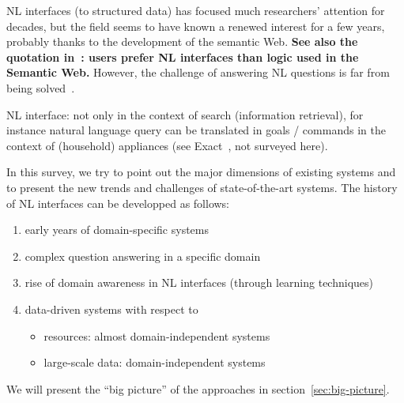 \documentclass[10pt,journal,letterpaper,compsoc]{IEEEtran}
\begin{document}
NL interfaces (to structured data) has focused much researchers' attention for
decades, but the field seems to have known a renewed interest for a few
years, probably thanks to the development of the semantic Web. {\bf See also
the quotation in~\cite{DBLP:journals/semweb/LopezUSM11}: users prefer NL interfaces
than logic used in the Semantic Web.}
However, the challenge of answering NL
questions is far from being solved~\cite{Kotov:2010:TNQ:1772690.1772746}.

NL interface: not only in the context of search (information retrieval), for
instance natural language query can be translated in goals / commands in the
context of (household) appliances (see {\sc
Exact}~\cite{Yates:2003:RNL:604045.604075}, not surveyed here).



In this survey, we try to point out the major dimensions of existing systems
and to present the new trends and challenges of state-of-the-art systems.
The history of NL interfaces can be developped as follows:
\begin{enumerate}
  \item early years of domain-specific systems
  \item complex question answering in a specific domain
  \item rise of domain awareness in NL interfaces (through learning techniques)
  \item data-driven systems with respect to
  \begin{itemize}
    \item resources: almost domain-independent systems
    \item large-scale data: domain-independent systems
  \end{itemize}
\end{enumerate}

We will present the ``big picture'' of the approaches in
section~\ref{sec:big-picture}.













\end{document}
